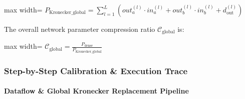 \begin{center}
\begin{adjustbox}{max width=\columnwidth}
$\displaystyle
P_{\text{Kronecker\_global}} = \sum_{l=1}^{L} \left( out_a^{(l)} \cdot in_a^{(l)} + out_b^{(l)} \cdot in_b^{(l)} + d_{\text{out}}^{(l)} \right)
$
\end{adjustbox}
\end{center}

The overall network parameter compression ratio $\mathcal{C}_{\text{global}}$ is:

\begin{center}
\begin{adjustbox}{max width=\columnwidth}
$\displaystyle
\mathcal{C}_{\text{global}} = \frac{P_{\text{dense}}}{P_{\text{Kronecker\_global}}}
$
\end{adjustbox}
\end{center}


\subsubsection*{Step-by-Step Calibration \& Execution Trace}

\paragraph{Dataflow \& Global Kronecker Replacement Pipeline}

